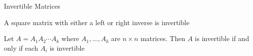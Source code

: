 \documentclass[8pt]{beamer}
\begin{document}
\begin{frame}{Invertible Matrices}
  \begin{corollary}
     A square matrix with either a left or right inverse is invertible
  \end{corollary}

  \begin{corollary}
     Let $A = A_1 A_2 \cdots A_k$ where $A_1, \dots, A_k$ are $n \times n$ matrices. Then $A$ is invertible if and only if each $A_i$ is invertible
  \end{corollary}
\end{frame}
\end{document}
